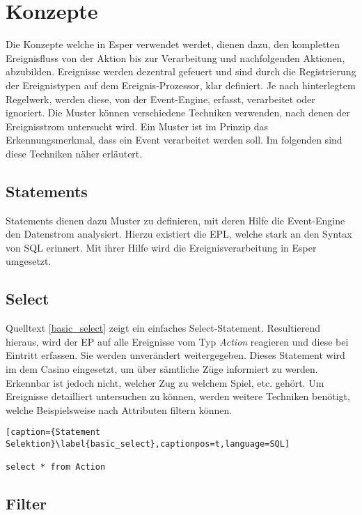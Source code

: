 \chapter{Konzepte}
Die Konzepte welche in Esper verwendet werdet, dienen dazu, den kompletten Ereignisfluss von der Aktion bis zur Verarbeitung und nachfolgenden Aktionen, abzubilden.
Ereignisse werden dezentral gefeuert und sind durch die Registrierung der Ereignistypen auf dem Ereignis-Prozessor, klar definiert. Je nach hinterlegtem Regelwerk, werden diese, von der Event-Engine, erfasst, verarbeitet oder ignoriert. Die Muster können verschiedene Techniken verwenden, nach denen der Ereignisstrom untersucht wird. Ein Muster ist im Prinzip das Erkennungsmerkmal, dass ein Event verarbeitet werden soll. Im folgenden sind diese Techniken näher erläutert.

\section{Statements}

Statements dienen dazu Muster zu definieren, mit deren Hilfe die Event-Engine den Datenstrom analysiert. Hierzu existiert die \acf{EPL}, welche stark an den Syntax von SQL erinnert. Mit ihrer Hilfe wird die Ereignisverarbeitung in Esper umgesetzt.

\section{Select}

Quelltext \ref{basic_select} zeigt ein einfaches Select-Statement. Resultierend hieraus, wird der \acf{EP} auf alle Ereignisse vom Typ \textit{Action} reagieren und diese bei Eintritt erfassen. Sie werden unverändert weitergegeben. Dieses Statement wird im dem Casino eingesetzt, um über sämtliche Züge informiert zu werden. Erkennbar ist jedoch nicht, welcher Zug zu welchem Spiel, etc. gehört. Um Ereignisse detailliert untersuchen zu können, werden weitere Techniken benötigt, welche Beispielsweise nach Attributen filtern können.

\begin{lstlisting}[caption={Statement Selektion}\label{basic_select},captionpos=t,language=SQL]

select * from Action

\end{lstlisting}

\section{Filter}

